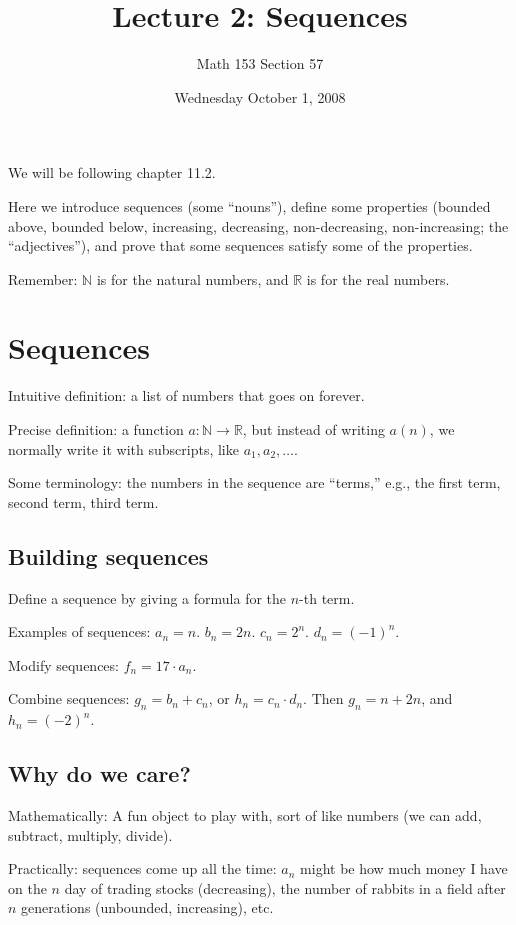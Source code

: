 \documentclass[12pt]{article}
\title{Lecture 2: Sequences}
\author{Math 153 Section 57}
\date{Wednesday October  1, 2008}
\newcommand{\N}{\mathbb{N}}
\newcommand{\R}{\mathbb{R}}
\begin{document}
\maketitle

We will be following chapter 11.2.

Here we introduce sequences (some ``nouns''), define some properties
(bounded above, bounded below, increasing, decreasing, non-decreasing,
non-increasing; the ``adjectives''), and prove that some sequences
satisfy some of the properties.

Remember: $\N$ is for the natural numbers, and $\R$ is for the real numbers.

\section{Sequences}

Intuitive definition: a list of numbers that goes on forever.

Precise definition: a function $a : \N \to \R$, but instead of writing $a(n)$, we normally write it with subscripts, like $a_1, a_2, \ldots$.

Some terminology: the numbers in the sequence are ``terms,'' e.g., the first term, second term, third term.

\subsection{Building sequences}

Define a sequence by giving a formula for the $n$-th term.

Examples of sequences: $a_n = n$.  $b_n = 2n$.  $c_n = 2^n$.  $d_n = (-1)^n$.

Modify sequences: $f_n = 17 \cdot a_n$.

Combine sequences: $g_n = b_n + c_n$, or $h_n = c_n \cdot d_n$.  Then $g_n = n + 2n$, and $h_n = (-2)^n$.

\subsection{Why do we care?}

Mathematically: A fun object to play with, sort of like numbers (we
can add, subtract, multiply, divide).

Practically: sequences come up all the time: $a_n$ might be how much
money I have on the $n$ day of trading stocks (decreasing), the number
of rabbits in a field after $n$ generations (unbounded, increasing),
etc.
\end{document}
